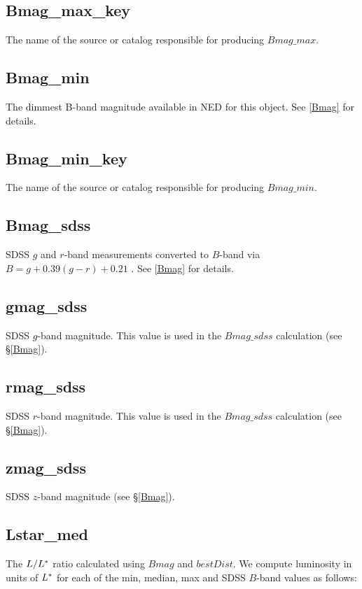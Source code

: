 \documentclass[twocolumn,tighten]{aastex62}
\begin{document}
\subsection{Bmag\_max\_key}
The name of the source or catalog responsible for producing $Bmag\_max$.

\subsection{Bmag\_min}
The dimmest B-band magnitude available in NED for this object. See \ref{Bmag} for details.

\subsection{Bmag\_min\_key}
The name of the source or catalog responsible for producing $Bmag\_min$.

\subsection{Bmag\_sdss} \label{Bmag_sdss}
SDSS $g$ and $r$-band measurements converted to $B$-band via $B = g + 0.39 (g-r) + 0.21$ \citep{jester2005}. See \ref{Bmag} for details.

\subsection{gmag\_sdss}
SDSS $g$-band magnitude. This value is used in the $Bmag\_sdss$ calculation (see \S \ref{Bmag}).

\subsection{rmag\_sdss}
SDSS $r$-band magnitude. This value is used in the $Bmag\_sdss$ calculation (see \S \ref{Bmag}).

\subsection{zmag\_sdss}
SDSS $z$-band magnitude (see \S \ref{Bmag}).

\subsection{Lstar\_med} \label{Lstar_med}
The $L / L^{\**}$ ratio calculated using $Bmag$ and $bestDist$. We compute luminosity in units of $L^{\**}$ for each of the min, median, max and SDSS $B$-band values as follows:
\end{document}
